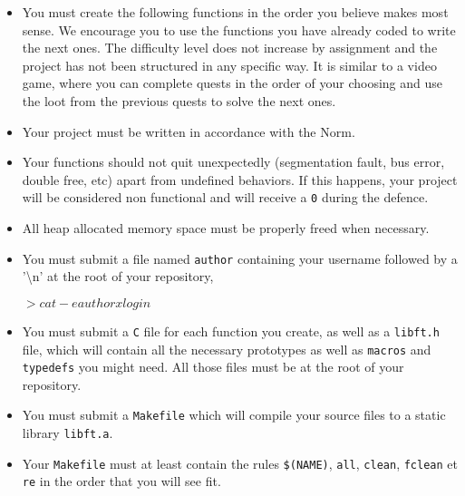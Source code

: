 \documentclass{42-en}
\begin{document}
    \begin{itemize}

        \item You must create the following functions in the order you
          believe makes most sense. We encourage you to use the
          functions you have already coded to write the next ones. The
          difficulty level does not increase by assignment and the
          project has not been structured in any specific way. It is
          similar to a video game, where you can complete quests in
          the order of your choosing and use the loot from the
          previous quests to solve the next ones.

      \item Your project must be written in accordance with the Norm.

      \item Your functions should not quit unexpectedly (segmentation
        fault, bus error, double free, etc) apart from undefined
        behaviors. If this happens, your project will be considered non
        functional and will receive a \texttt{0} during the defence.

        \item All heap allocated memory space must be properly freed
          when necessary.

      \item You must submit a file
        named \texttt{author} containing your username followed by a
        '\textbackslash{}n' at the root of your repository,

      \begin{42console}
$>cat -e author
xlogin$\end{42console}

        \item You must submit a \texttt{C} file for each function you
          create, as well as a \texttt{libft.h} file, which will
          contain all the necessary prototypes as well as
          \texttt{macros} and \texttt{typedefs} you might need. All
          those files must be at the root of your repository.

        \item You must submit a \texttt{Makefile} which will compile
          your source files to a static library \texttt{libft.a}.

        \item Your \texttt{Makefile} must at least contain the rules
          \texttt{\$(NAME)}, \texttt{all}, \texttt{clean},
          \texttt{fclean} et \texttt{re} in the order that you will
          see fit.


\end{itemize}
\end{document}
